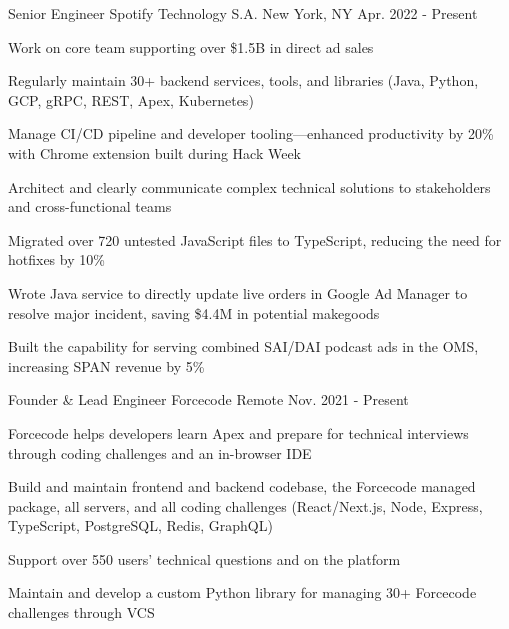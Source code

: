 

\begin{cventries}

  \cventry
    {Senior Engineer} %
    {Spotify Technology S.A.} %
    {New York, NY} %
    {Apr. 2022 - Present} %
    {
      \begin{cvitems} 
        \item {Work on core team supporting over \$1.5B in direct ad sales}
        \item {Regularly maintain 30+ backend services, tools, and libraries (Java, Python, GCP, gRPC, REST, Apex, Kubernetes)}
        \item {Manage CI/CD pipeline and developer tooling---enhanced productivity by 20\% with Chrome extension built during Hack Week}
        \item {Architect and clearly communicate complex technical solutions to stakeholders and cross-functional teams}
        \item {Migrated over 720 untested JavaScript files to TypeScript, reducing the need for hotfixes by 10\%}
        \item {Wrote Java service to directly update live orders in Google Ad Manager to resolve major incident, saving \$4.4M in potential makegoods}
        \item {Built the capability for serving combined SAI/DAI podcast ads in the OMS, increasing SPAN revenue by 5\%}
      \end{cvitems}
    }

  \cventry
    {Founder \& Lead Engineer} %
    {Forcecode} %
    {Remote} %
    {Nov. 2021 - Present} %
    {
      \begin{cvitems} %
        \item {Forcecode helps developers learn Apex and prepare for technical interviews through coding challenges and an in-browser IDE}
        \item {Build and maintain frontend and backend codebase, the Forcecode managed package, all servers, and all coding challenges (React/Next.js, Node, Express, TypeScript, PostgreSQL, Redis, GraphQL)}
        \item {Support over 550 users' technical questions and on the platform}
        \item {Maintain and develop a custom Python library for managing 30+ Forcecode challenges through VCS}
      \end{cvitems}
    }


\end{cventries}
